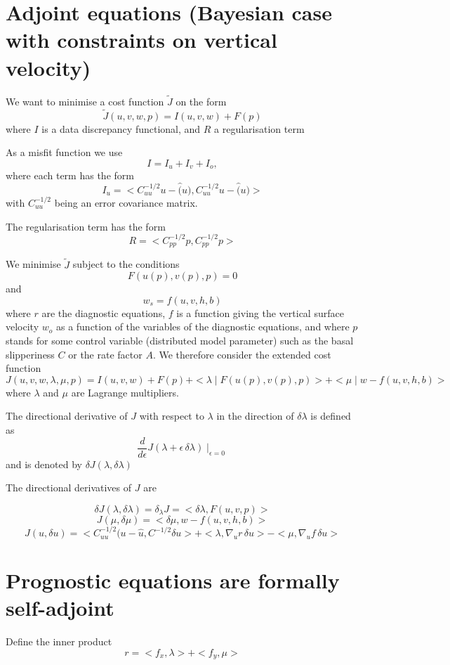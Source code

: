 \documentclass[10pt,a4paper]{book}
\begin{document}
\section{Adjoint equations (Bayesian case with constraints on vertical velocity)}

We want to minimise a cost function $\tilde{J}$ on the form
\[
\tilde{J}(u,v,w,p)=I(u,v,w)+F(p)
\]
where $I$ is a data discrepancy functional, and $R$ a regularisation term


As a misfit function we use
\[ I=I_u+I_v+I_o ,\]
where each term has the form
\[
I_u=<C^{-1/2}_{uu} u-\hat(u) , C^{-1/2}_{uu} u-\hat(u) >
\]
with $C^{-1/2}_{uu}$ being an error covariance matrix.

The regularisation term has the form
\[
R=<C^{-1/2}_{pp} p , C^{-1/2}_{pp} p >
\]

We minimise $\tilde{J}$ subject to the conditions 
\[ F(u(p),v(p),p)=0\]
and 
\[
w_s=f(u,v,h,b)
\]
where $r$ are the diagnostic equations, $f$ is a function giving
the vertical surface velocity $w_o$ as a function of the variables of
the diagnostic equations, and where $p$ stands for some control variable
(distributed model parameter) such as the basal slipperiness $C$ or
the rate factor $A$. We therefore consider the extended cost function
\[
J(u,v,w,\lambda,\mu,p)=I(u,v,w)+F(p)+<\lambda\mid F(u(p),v(p),p)>+<\mu\mid w-f(u,v,h,b)>
\]
where $\lambda$ and $\mu$ are Lagrange multipliers.

The directional derivative of $J$ with respect to $\lambda$ in the direction of $\delta \lambda$ is defined as
\[ \frac{d}{d \epsilon} J(\lambda+\epsilon \, \delta \lambda)\mid_{\epsilon=0}\] and is denoted by $\delta J(\lambda,\delta \lambda)$


The directional derivatives of $J$ are

\[ \delta J(\lambda,\delta \lambda) = \delta_{\lambda} J =<\delta \lambda,F(u,v,p)> \]
\[ J(\mu,\delta \mu) =<\delta \mu, w-f(u,v,h,b)> \]
\[ J(u,\delta u)=<C^{-1/2}_{uu} (u-\hat{u},C^{-1/2} \delta u > + < \lambda, \nabla_u r \, \delta u>-<\mu , \nabla_u f \, \delta u> \]


\section{Prognostic equations are formally self-adjoint}



Define the inner product
\[
r=< f_x , \lambda> + <f_y , \mu>
\]
\end{document}
